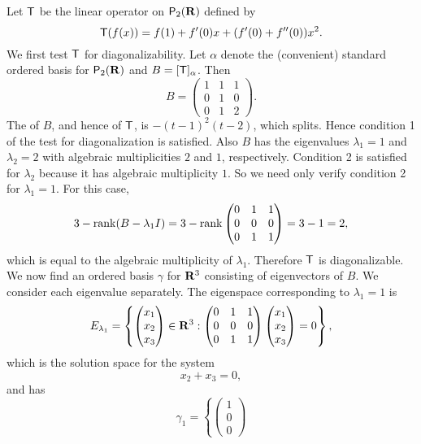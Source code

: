 \begin{example} \label{example 5.2.6}
Let \(\textsf{T}\) be the linear operator on \(\textsf{P}_2(\mathbf{R})\) defined by
\[
    \textsf{T}(f(x)) = f(1) + f'(0)x + (f'(0) + f''(0))x^2.
\]
We first test \(\textsf{T}\) for diagonalizability.
Let \(\alpha\) denote the (convenient) standard ordered basis for \(\textsf{P}_2(\mathbf{R})\) and \(B = [\textsf{T}]_{\alpha}\).
Then
\[
    B = \begin{pmatrix} 1 & 1 & 1 \\ 0 & 1 & 0 \\ 0 & 1 & 2 \end{pmatrix}.
\]
The \CPOLY{} of \(B\), and hence of \(\textsf{T}\), is \(-(t - 1)^2(t - 2)\), which splits.
Hence condition 1 of the test for diagonalization is satisfied.
Also \(B\) has the eigenvalues \(\lambda_1 = 1\) and \(\lambda_2 = 2\) with algebraic multiplicities \(2\) and \(1\), respectively.
Condition 2 is satisfied for \(\lambda_2\) because it has algebraic multiplicity \(1\).
So we need only verify condition 2 for \(\lambda_1 = 1\).
For this case,
\[
    3 - \mathrm{rank}(B - \lambda_1 I) = 3 - \mathrm{rank} \begin{pmatrix} 0 & 1 & 1 \\ 0 & 0 & 0 \\ 0 & 1 & 1 \end{pmatrix} = 3 - 1 = 2,
\]
which is equal to the algebraic multiplicity of \(\lambda_1\).
Therefore \(\textsf{T}\) is diagonalizable.
We now find an ordered basis \(\gamma\) for \(\mathbf{R}^3\) consisting of eigenvectors of \(B\).
We consider each eigenvalue separately.
The eigenspace corresponding to \(\lambda_1 = 1\) is
\[
    E_{\lambda_1} = \left\{ \begin{pmatrix}
        x_1 \\ x_2 \\ x_3
    \end{pmatrix} \in \mathbf{R}^3 : \begin{pmatrix}
        0 & 1 & 1 \\ 0 & 0 & 0 \\ 0 & 1 & 1
    \end{pmatrix} \begin{pmatrix}
        x_1 \\ x_2 \\ x_3
    \end{pmatrix} = 0
    \right\},
\]
which is the solution space for the system
\[
    x_2 + x_3 = 0,
\]
and has
\[
    \gamma_1 = \left\{ \begin{pmatrix}
        1 \\ 0 \\ 0

\end{pmatrix}\]
\end{example}
